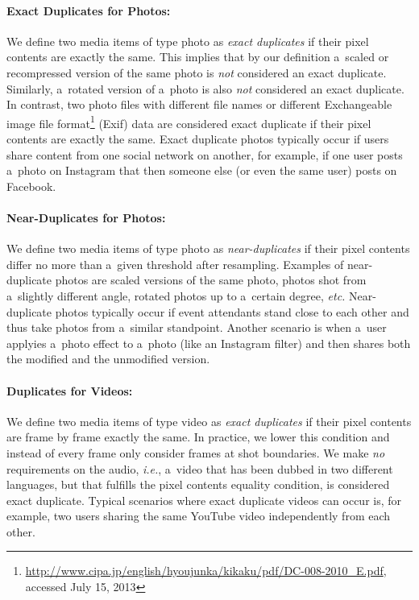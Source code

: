 \paragraph{Exact Duplicates for Photos:}

We define two media items of type photo as \emph{exact duplicates}
if their pixel contents are exactly the same.
This implies that by our definition a~scaled or recompressed version
of the same photo is \emph{not} considered an exact duplicate. 
Similarly, a~rotated version of a~photo is also \emph{not}
considered an exact duplicate. 
In contrast, two photo files with different file names
or different Exchangeable image file
format\footnote{\url{http://www.cipa.jp/english/hyoujunka/kikaku/pdf/DC-008-2010_E.pdf},
accessed July 15, 2013}
(Exif) data are considered exact duplicate
if their pixel contents are exactly the same.
Exact duplicate photos typically occur if users share content 
from one social network on another, for example,
if one user posts a~photo on Instagram that then someone else
(or even the same user) posts on Facebook.

\paragraph{Near-Duplicates for Photos:}

We define two media items of type photo as \emph{near-duplicates}
if their pixel contents differ no more than a~given threshold after resampling.
Examples of near-duplicate photos are scaled versions
of the same photo, photos shot from a~slightly different angle,
rotated photos up to a~certain degree, \emph{etc.}
Near-duplicate photos typically occur if event attendants
stand close to each other and thus take photos
from a~similar standpoint.
Another scenario is when a~user applyies a~photo effect to a~photo
(like an Instagram filter) and then shares both the modified
and the unmodified version.

\paragraph{Duplicates for Videos:}

We define two media items of type video as \emph{exact duplicates}
if their pixel contents are frame by frame exactly the same.
In practice, we lower this condition and instead of every frame
only consider frames at shot boundaries.
We make \emph{no} requirements on the audio, \emph{i.e.},
a~video that has been dubbed in two different languages,
but that fulfills the pixel contents equality condition,
is considered exact duplicate.
Typical scenarios where exact duplicate videos can occur is,
for example, two users sharing the same YouTube video
independently from each other.

